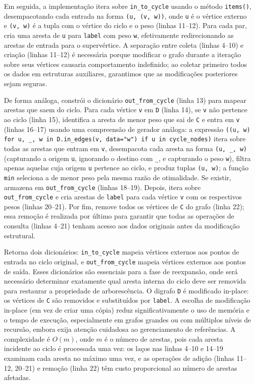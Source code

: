 Em seguida, a implementação itera sobre \texttt{in\_to\_cycle} usando o método \texttt{items()}, desempacotando cada entrada na forma \texttt{(u, (v, w))}, onde \texttt{u} é o vértice externo e \texttt{(v, w)} é a tupla com o vértice do ciclo e o peso (linhas 11--12). Para cada par, cria uma aresta de \texttt{u} para \texttt{label} com peso \texttt{w}, efetivamente redirecionando as arestas de entrada para o supervértice. A separação entre coleta (linhas 4--10) e criação (linhas 11--12) é necessária porque modificar o grafo durante a iteração sobre seus vértices causaria comportamento indefinido; ao coletar primeiro todos os dados em estruturas auxiliares, garantimos que as modificações posteriores sejam seguras.

De forma análoga, constrói o dicionário \texttt{out\_from\_cycle} (linha 13) para mapear arestas que saem do ciclo. Para cada vértice \texttt{v} em \texttt{D} (linha 14), se \texttt{v} não pertence ao ciclo (linha 15), identifica a aresta de menor peso que sai de \texttt{C} e entra em \texttt{v} (linhas 16--17) usando uma compreensão de gerador análoga: a expressão \texttt{((u, w) for u, \_, w in D.in\_edges(v, data="w") if u in cycle\_nodes)} itera sobre todas as arestas que entram em \texttt{v}, desempacota cada aresta na forma \texttt{(u, \_, w)} (capturando a origem \texttt{u}, ignorando o destino com \texttt{\_}, e capturando o peso \texttt{w}), filtra apenas aquelas cuja origem \texttt{u} pertence ao ciclo, e produz tuplas \texttt{(u, w)}; a função \texttt{min} seleciona a de menor peso pela mesma razão de otimalidade. Se existir, armazena em \texttt{out\_from\_cycle} (linhas 18--19). Depois, itera sobre \texttt{out\_from\_cycle} e cria arestas de \texttt{label} para cada vértice \texttt{v} com os respectivos pesos (linhas 20--21). Por fim, remove todos os vértices de \texttt{C} do grafo (linha 22); essa remoção é realizada por último para garantir que todas as operações de consulta (linhas 4--21) tenham acesso aos dados originais antes da modificação estrutural.

Retorna dois dicionários: \texttt{in\_to\_cycle} mapeia vértices externos aos pontos de entrada no ciclo original, e \texttt{out\_from\_cycle} mapeia vértices externos aos pontos de saída. Esses dicionários são essenciais para a fase de reexpansão, onde será necessário determinar exatamente qual aresta interna do ciclo deve ser removida para restaurar a propriedade de arborescência. O digrafo \texttt{D} é modificado in-place: os vértices de \texttt{C} são removidos e substituídos por \texttt{label}. A escolha de modificação in-place (em vez de criar uma cópia) reduz significativamente o uso de memória e o tempo de execução, especialmente em grafos grandes ou com múltiplos níveis de recursão, embora exija atenção cuidadosa ao gerenciamento de referências. A complexidade é \(O(m)\), onde \(m\) é o número de arestas, pois cada aresta incidente ao ciclo é processada uma vez: os laços nas linhas 4--10 e 14--19 examinam cada aresta no máximo uma vez, e as operações de adição (linhas 11--12, 20--21) e remoção (linha 22) têm custo proporcional ao número de arestas afetadas.

